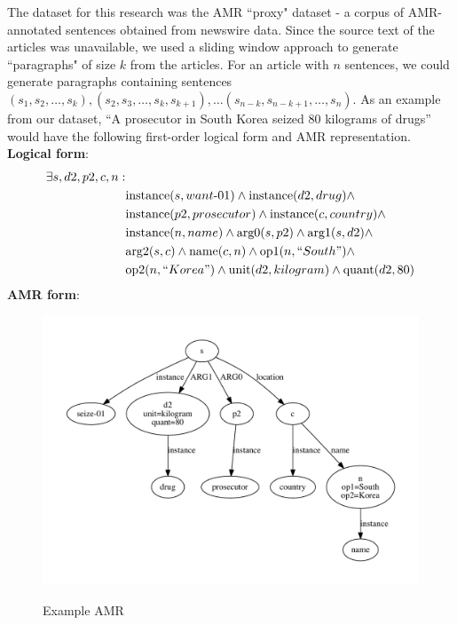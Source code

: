 \documentclass[12pt]{article}
\begin{document}
The dataset for this research was the AMR ``proxy" dataset - a corpus of
AMR-annotated sentences obtained from newswire data. Since the source text of
the articles was unavailable, we used a sliding window approach to generate
``paragraphs" of size $k$ from the articles. For an article with $n$ sentences,
we could generate paragraphs containing sentences $(s_1,s_2,\ldots,s_k),
(s_2,s_3,\ldots,s_k,s_{k+1}), \ldots (s_{n-k},s_{n-k+1},\ldots,s_n)$.
As an example from our dataset, ``A prosecutor in South Korea seized 80
kilograms of drugs'' would have the following first-order logical form and AMR
representation.\\

\noindent \textbf{Logical form}:
\begin{equation}
\begin{split}
\exists s,d2,p2,c,n: &\\
&\text{instance}(s,want\text{-}01) \wedge \text{instance}(d2, drug) \wedge \\
&\text{instance}(p2, prosecutor) \wedge \text{instance}(c, country) \wedge \\
&\text{instance}(n, name) \wedge \text{arg0}(s,p2) \wedge \text{arg1}(s,d2)
\wedge \\ &\text{arg2}(s,c) \wedge \text{name}(c,n) \wedge \text{op1}(n,
``South") \wedge \\ &\text{op2}(n, ``Korea") \wedge \text{unit}(d2, kilogram)
\wedge \text{quant}(d2, 80)
\end{split}
\end{equation}
\textbf{AMR form}:
\begin{figure}
\includegraphics[width=\linewidth]{amr_example.pdf}
\label{fig:amr_example}
\caption{Example AMR}
\end{figure}
\end{document}
